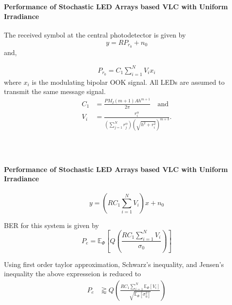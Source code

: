 \documentclass{beamer}
\providecommand{\sbrak}[1]{\ensuremath{{}\left[#1\right]}}
\providecommand{\brak}[1]{\ensuremath{\left(#1\right)}}
\theoremstyle{remark}
\begin{document}
\begin{frame}
\frametitle{\,}
\framesubtitle{Performance of Stochastic LED Arrays based VLC with Uniform Irradiance}
\begin{list}{}{}
\vfill
\item<1->The received symbol at the central photodetector is given by 
\begin{equation}
y=RP_{r_0}+n_0 \nonumber
\label{rx_center}
\end{equation}
and,
\item<2>
\vspace{-.4in}
\begin{align}
P_{r_0}
=C_1\sum_{i=1}^NV_i x_i  \nonumber
\label{pr_exact}
\end{align}
where $x_i$ is the modulating bipolar OOK signal. All LEDs are assumed to transmit the same message signal.
\footnotesize{
\begin{equation}
\begin{split}
C_1&=\frac{PM_I\brak{m+1}Ah^{m+1}}{2\pi} \quad \text{and}
\\
V_i &= \frac{r_i^{\alpha}}{ \brak{\sum_{j=1}^Nr_j^{\alpha}}\brak{\sqrt{h^2+r_i^2}}^{m+3}}.
\end{split} \nonumber
\label{variable_Vi}
\end{equation}
}
\vfill
\end{list}
\end{frame}

\begin{frame}
\frametitle{\,}
\framesubtitle{Performance of Stochastic LED Arrays based VLC with Uniform Irradiance}
\begin{list}{}{}
\vfill
\item<1->
\begin{equation}
y =  \brak{RC_1\sum_{i=1}^NV_i}x+n_0 \nonumber
\label{rx_exact}
\end{equation}
\vfill
\item<2->
BER for this system is given by
\begin{equation}
P_e  =\mathbb{E}_{\Phi}\sbrak{\textit{Q}\brak{\frac{RC_1\sum_{i=1}^N V_i}{\sigma_0}}} \nonumber
\end{equation}
\vfill
\item<3>
 Using first order taylor approximation, Schwarz's inequality, and Jensen's inequality the above expresseion is reduced to
\begin{equation}
\begin{split}
P_e  &\gtrapprox  \textit{Q}\brak{\frac{RC_1\sum_{i=1}^N \mathbb{E}_{\Phi}\sbrak {V_i}}{ \sqrt{\mathbb{E}_{\Phi}\sbrak{\sigma_0^2}}}}
  \end{split}\nonumber
\label{BER_final}
\end{equation}
\vfill
\end{list}
\end{frame}
\end{document}
